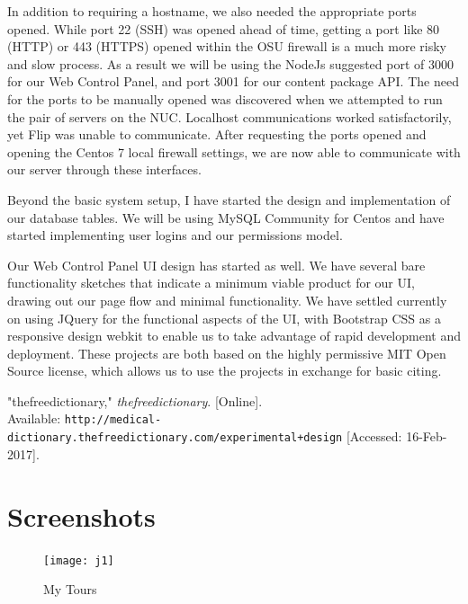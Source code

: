 \documentclass[letterpaper, 10pt,titlepage]{article}
\begin{document}
In addition to requiring a hostname, we also needed the appropriate ports opened. While port 22 (SSH) was opened ahead of time, getting a port like 80 (HTTP) or 443 (HTTPS) opened within the OSU firewall is a much more risky and slow process. As a result we will be using the NodeJs suggested port of 3000 for our Web Control Panel, and port 3001 for our content package API. The need for the ports to be manually opened was discovered when we attempted to run the pair of servers on the NUC. Localhost communications worked satisfactorily, yet Flip was unable to communicate. After requesting the ports opened and opening the Centos 7 local firewall settings, we are now able to communicate with our server through these interfaces.

Beyond the basic system setup, I have started the design and implementation of our database tables. We will be using MySQL Community for Centos and have started implementing user logins and our permissions model.

Our Web Control Panel UI design has started as well. We have several bare functionality sketches that indicate a minimum viable product for our UI, drawing out our page flow and minimal functionality. We have settled currently on using JQuery for the functional aspects of the UI, with Bootstrap CSS as a responsive design webkit to enable us to take advantage of rapid development and deployment. These projects are both based on the highly permissive MIT Open Source license, which allows us to use the projects in exchange for basic citing. 


\newpage %
\begin{thebibliography}{9}

"thefreedictionary," \textit{thefreedictionary}. [Online]. \\Available:
\texttt{http://medical-dictionary.thefreedictionary.com/experimental+design} [Accessed: 16-Feb-2017].

\end{thebibliography}




\newpage
\section{Screenshots}

\begin{figure}[ht]
    \centering
    \texttt{[image: j1]}
    \caption{My Tours}
    \label{jiawei1}
\end{figure}
\end{document}
